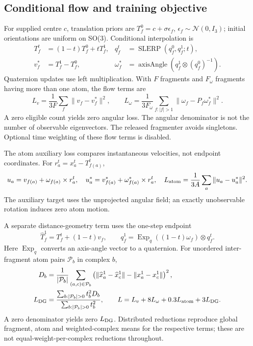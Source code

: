 \subsection{Conditional flow and training objective}
For supplied centre $c$, translation priors are
$T_f^0=c+\sigma\epsilon_f$, $\epsilon_f\sim\mathcal N(0,I_3)$;
initial orientations are uniform on SO(3). Conditional interpolation is
\begin{align}
 T_f^t&=(1-t)T_f^0+tT_f^1,&
 q_f^t&=\operatorname{SLERP}(q_f^0,q_f^1;t),\\
 v_f^*&=T_f^1-T_f^0,&
 \omega_f^*&=\operatorname{axisAngle}(q_f^1\otimes(q_f^0)^{-1}).
 \label{eq:effdock-flow-targets}
\end{align}
Quaternion updates use left multiplication. With $F$ fragments and
$F_\omega$ fragments having more than one atom, the flow terms are
\begin{equation}
 L_v=\frac{1}{3F}\sum_f\|v_f-v_f^*\|^2,\qquad
 L_\omega=\frac{1}{3F_\omega}\sum_{f:|f|>1}
 \|\omega_f-P_f\omega_f^*\|^2.
 \label{eq:effdock-flow-loss}
\end{equation}
A zero eligible count yields zero angular loss. The angular denominator is
not the number of observable eigenvectors. The released fragmenter avoids
singletons. Optional time weighting of these flow terms is disabled.

The atom auxiliary loss compares instantaneous velocities, not endpoint
coordinates. For $r_a^t=x_a^t-T_{f(a)}^t$,
\begin{equation}
 u_a=v_{f(a)}+\omega_{f(a)}\times r_a^t,\quad
 u_a^*=v_{f(a)}^*+\omega_{f(a)}^*\times r_a^t,\quad
 L_{\rm atom}=\frac{1}{3A}\sum_a\|u_a-u_a^*\|^2.
 \label{eq:effdock-atom-loss}
\end{equation}
The auxiliary target uses the unprojected angular field; an exactly
unobservable rotation induces zero atom motion.

A separate distance-geometry term uses the one-step endpoint
\begin{equation}
 \widehat T_f^1=T_f^t+(1-t)v_f,\qquad
 \widehat q_f^1=\operatorname{Exp}_q((1-t)\omega_f)\otimes q_f^t.
\end{equation}
Here $\operatorname{Exp}_q$ converts an axis-angle vector to a quaternion.
For unordered inter-fragment atom pairs $\mathcal P_b$ in complex $b$,
\begin{align}
 D_b&=\frac{1}{|\mathcal P_b|}\sum_{(a,c)\in\mathcal P_b}
 \left(\|\widehat x_a^1-\widehat x_c^1\|-\|x_a^1-x_c^1\|\right)^2,\\
 L_{\rm DG}&=\frac{\sum_{b:|\mathcal P_b|>0}t_b^2D_b}
 {\sum_{b:|\mathcal P_b|>0}t_b^2},\qquad
 L=L_v+8L_\omega+0.3L_{\rm atom}+3L_{\rm DG}.
 \label{eq:effdock-total-loss}
\end{align}
A zero denominator yields zero $L_{\rm DG}$. Distributed reductions reproduce
global fragment, atom and weighted-complex means for the respective terms;
these are not equal-weight-per-complex reductions throughout.

